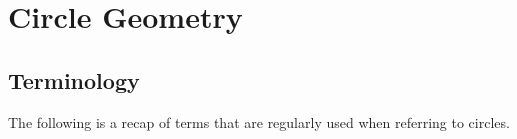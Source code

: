 \section{Circle Geometry}

\subsection{Terminology}
The following is a recap of terms that are regularly used when referring to circles.

